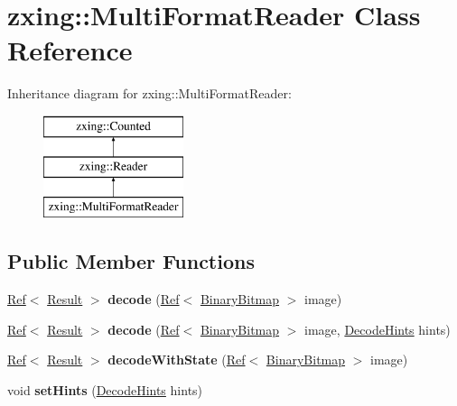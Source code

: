 \hypertarget{classzxing_1_1_multi_format_reader}{}\section{zxing\+:\+:Multi\+Format\+Reader Class Reference}
\label{classzxing_1_1_multi_format_reader}
Inheritance diagram for zxing\+:\+:Multi\+Format\+Reader\+:\begin{figure}[H]
\begin{center}
\leavevmode
\includegraphics[height=3.000000cm]{classzxing_1_1_multi_format_reader}
\end{center}
\end{figure}
\subsection*{Public Member Functions}
\begin{DoxyCompactItemize}
\item 
\mbox{\label{classzxing_1_1_multi_format_reader_af83bc621db6aab530bd4a76b7e61afa7}} 
\mbox{\hyperlink{classzxing_1_1_ref}{Ref}}$<$ \mbox{\hyperlink{classzxing_1_1_result}{Result}} $>$ {\bfseries decode} (\mbox{\hyperlink{classzxing_1_1_ref}{Ref}}$<$ \mbox{\hyperlink{classzxing_1_1_binary_bitmap}{Binary\+Bitmap}} $>$ image)
\item 
\mbox{\label{classzxing_1_1_multi_format_reader_a13d7b968e095662e0994735b6c6d95f0}} 
\mbox{\hyperlink{classzxing_1_1_ref}{Ref}}$<$ \mbox{\hyperlink{classzxing_1_1_result}{Result}} $>$ {\bfseries decode} (\mbox{\hyperlink{classzxing_1_1_ref}{Ref}}$<$ \mbox{\hyperlink{classzxing_1_1_binary_bitmap}{Binary\+Bitmap}} $>$ image, \mbox{\hyperlink{classzxing_1_1_decode_hints}{Decode\+Hints}} hints)
\item 
\mbox{\label{classzxing_1_1_multi_format_reader_acc267357a61fc4e39705ca30de1c8ae1}} 
\mbox{\hyperlink{classzxing_1_1_ref}{Ref}}$<$ \mbox{\hyperlink{classzxing_1_1_result}{Result}} $>$ {\bfseries decode\+With\+State} (\mbox{\hyperlink{classzxing_1_1_ref}{Ref}}$<$ \mbox{\hyperlink{classzxing_1_1_binary_bitmap}{Binary\+Bitmap}} $>$ image)
\item 
\mbox{\label{classzxing_1_1_multi_format_reader_a11ca0e117fbb95513424360ec55fde33}} 
void {\bfseries set\+Hints} (\mbox{\hyperlink{classzxing_1_1_decode_hints}{Decode\+Hints}} hints)
\end{DoxyCompactItemize}


